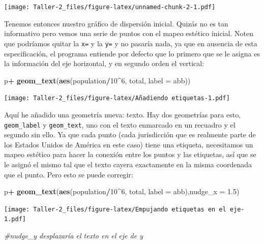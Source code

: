 \documentclass[
]{article}
\newenvironment{Shaded}{\begin{snugshade}}{\end{snugshade}}
\newcommand{\AttributeTok}[1]{\textcolor[rgb]{0.13,0.29,0.53}{#1}}
\newcommand{\CommentTok}[1]{\textcolor[rgb]{0.56,0.35,0.01}{\textit{#1}}}
\newcommand{\DecValTok}[1]{\textcolor[rgb]{0.00,0.00,0.81}{#1}}
\newcommand{\FloatTok}[1]{\textcolor[rgb]{0.00,0.00,0.81}{#1}}
\newcommand{\FunctionTok}[1]{\textcolor[rgb]{0.13,0.29,0.53}{\textbf{#1}}}
\newcommand{\NormalTok}[1]{#1}
\newcommand{\SpecialCharTok}[1]{\textcolor[rgb]{0.81,0.36,0.00}{\textbf{#1}}}
\begin{document}
\texttt{[image: Taller-2\_files/figure-latex/unnamed-chunk-2-1.pdf]}

Tenemos entonces nuestro gráfico de dispersión inicial. Quizás no es tan
informativo pero vemos una serie de puntos con el mapeo estético
inicial. Noten que podríamos quitar la \texttt{x=} y la \texttt{y=} y no
pasaría nada, ya que en ausencia de esta especificación, el programa
entiende por defecto que lo primero que se le asigna es la información
del eje horizontal, y en segundo orden el vertical:

\begin{Shaded}
\begin{Highlighting}[]
\NormalTok{p}\SpecialCharTok{+}
  \FunctionTok{geom\_text}\NormalTok{(}\FunctionTok{aes}\NormalTok{(population}\SpecialCharTok{/}\DecValTok{10}\SpecialCharTok{\^{}}\DecValTok{6}\NormalTok{, total, }\AttributeTok{label =}\NormalTok{ abb))}
\end{Highlighting}
\end{Shaded}

\texttt{[image: Taller-2\_files/figure-latex/Añadiendo etiquetas-1.pdf]}

Aquí he añadido una geometría nueva: texto. Hay dos geometrías para
esto, \texttt{geom\_label} y \texttt{geom\_text}, uno con el texto
enmarcado en un recuadro y el segundo sin ello. Ya que cada punto (cada
jurisdicción que es realmente parte de los Estados Unidos de América en
este caso) tiene una etiqueta, necesitamos un mapeo estético para hacer
la conexión entre los puntos y las etiquetas, así que se le asignó el
mismo tal que el texto cayera exactamente en la misma coordenada que el
punto. Pero esto se puede corregir:

\begin{Shaded}
\begin{Highlighting}[]
\NormalTok{p}\SpecialCharTok{+}
  \FunctionTok{geom\_text}\NormalTok{(}\FunctionTok{aes}\NormalTok{(population}\SpecialCharTok{/}\DecValTok{10}\SpecialCharTok{\^{}}\DecValTok{6}\NormalTok{, total, }\AttributeTok{label =}\NormalTok{ abb),}\AttributeTok{nudge\_x =} \FloatTok{1.5}\NormalTok{) }
\end{Highlighting}
\end{Shaded}

\texttt{[image: Taller-2\_files/figure-latex/Empujando etiquetas en el eje-1.pdf]}

\begin{Shaded}
\begin{Highlighting}[]
\CommentTok{\#nudge\_y desplazaría el texto en el eje de y}
\end{Highlighting}
\end{Shaded}
\end{document}
